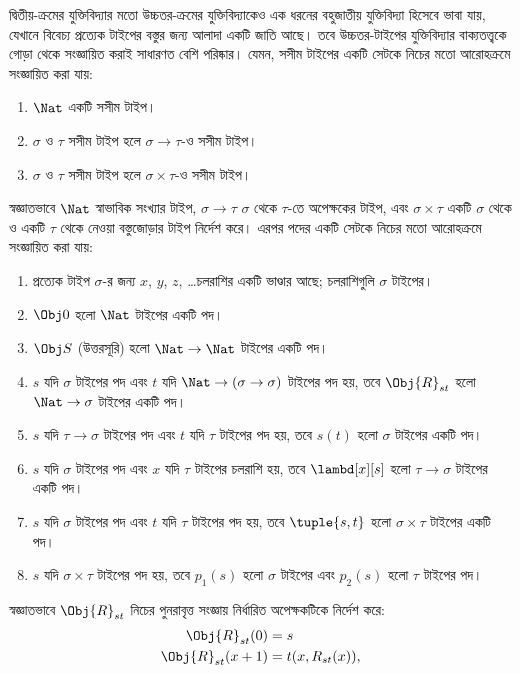 \documentclass[../../../include/open-logic-section]{subfiles}
\begin{document}
দ্বিতীয়-ক্রমের যুক্তিবিদ্যার মতো উচ্চতর-ক্রমের যুক্তিবিদ্যাকেও এক
ধরনের বহুজাতীয় যুক্তিবিদ্যা হিসেবে ভাবা যায়, যেখানে বিবেচ্য প্রত্যেক
টাইপের বস্তুর জন্য আলাদা একটি জাতি আছে। তবে উচ্চতর-টাইপের যুক্তিবিদ্যার
বাক্যতত্ত্বকে গোড়া থেকে সংজ্ঞায়িত করাই সাধারণত বেশি পরিষ্কার। যেমন,
সসীম টাইপের একটি সেটকে নিচের মতো আরোহক্রমে সংজ্ঞায়িত করা যায়:
\begin{enumerate}
\item $\Nat$ একটি সসীম টাইপ।
\item $\sigma$ ও $\tau$ সসীম টাইপ হলে $\sigma \to \tau$-ও সসীম
  টাইপ।
\item $\sigma$ ও $\tau$ সসীম টাইপ হলে $\sigma \times \tau$-ও সসীম
  টাইপ।
\end{enumerate}
স্বজ্ঞাতভাবে $\Nat$ স্বাভাবিক সংখ্যার টাইপ, $\sigma \to \tau$
$\sigma$ থেকে $\tau$-তে অপেক্ষকের টাইপ, এবং $\sigma \times \tau$
একটি $\sigma$ থেকে ও একটি $\tau$ থেকে নেওয়া বস্তুজোড়ার টাইপ নির্দেশ
করে। এরপর পদের একটি সেটকে নিচের মতো আরোহক্রমে সংজ্ঞায়িত করা যায়:
\begin{enumerate}
\item প্রত্যেক টাইপ $\sigma$-র জন্য $x$, $y$, $z$, \dots চলরাশির
  একটি ভাণ্ডার আছে; চলরাশিগুলি $\sigma$ টাইপের।
\item $\Obj 0$ হলো $\Nat$ টাইপের একটি পদ।
\item $\Obj S$ (উত্তরসূরি) হলো $\Nat \to \Nat$ টাইপের একটি পদ।
\item $s$ যদি $\sigma$ টাইপের পদ এবং $t$ যদি $\Nat \to (\sigma
  \to \sigma)$ টাইপের পদ হয়, তবে $\Obj{R}_{st}$ হলো $\Nat \to
  \sigma$ টাইপের একটি পদ।
\item $s$ যদি $\tau \to \sigma$ টাইপের পদ এবং $t$ যদি $\tau$ টাইপের
  পদ হয়, তবে $s(t)$ হলো $\sigma$ টাইপের একটি পদ।
\item $s$ যদি $\sigma$ টাইপের পদ এবং $x$ যদি $\tau$ টাইপের চলরাশি
  হয়, তবে $\lambd[x][s]$ হলো $\tau \to \sigma$ টাইপের একটি পদ।
\item $s$ যদি $\sigma$ টাইপের পদ এবং $t$ যদি $\tau$ টাইপের পদ হয়,
  তবে $\tuple{s, t}$ হলো $\sigma \times \tau$ টাইপের একটি পদ।
\item $s$ যদি $\sigma \times \tau$ টাইপের পদ হয়, তবে $p_1(s)$
  হলো $\sigma$ টাইপের এবং $p_2(s)$ হলো $\tau$ টাইপের পদ।
\end{enumerate}
স্বজ্ঞাতভাবে $\Obj{R}_{st}$ নিচের পুনরাবৃত্ত সংজ্ঞায় নির্ধারিত
অপেক্ষকটিকে নির্দেশ করে:
\begin{align*}
\Obj{R}_{st}(0) & = s \\
\Obj{R}_{st}(x+1) & = t(x, R_{st}(x)),
\end{align*}
\end{document}
